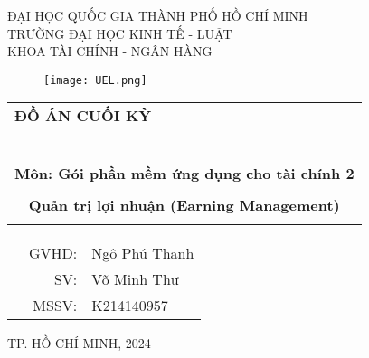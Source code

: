 \documentclass[a4paper]{article}
\begin{document}
\begin{titlepage}
\begin{center}
ĐẠI HỌC QUỐC GIA THÀNH PHỐ HỒ CHÍ MINH \\
TRƯỜNG ĐẠI HỌC KINH TẾ - LUẬT \\
KHOA TÀI CHÍNH - NGÂN HÀNG 
\end{center}

\vspace{1cm}

\begin{figure}[h!]
\begin{center}
\texttt{[image: UEL.png]}
\end{center}
\end{figure}

\vspace{1cm}


\begin{center}
\begin{tabular}{c}
	\multicolumn{1}{l}{\textbf{{\Large ĐỒ ÁN CUỐI KỲ}}}\\
	~~\\
	\hline
	\\
	\multicolumn{1}{l}{\textbf{{\Large Môn: Gói phần mềm ứng dụng cho tài chính 2}}}\\
	\\
	
	\textbf{{\Large Quản trị lợi nhuận (Earning Management)}}\\
	\\
	\hline
\end{tabular}
\end{center}

\vspace{3cm}

\begin{table}[h]
\begin{tabular}{rrl}
\hspace{5 cm} & GVHD: & Ngô Phú Thanh\\
& SV: & Võ Minh Thư\\
& MSSV: & K214140957\\
\end{tabular}
\end{table}

\begin{center}
{\footnotesize TP. HỒ CHÍ MINH, 2024}
\end{center}
\end{titlepage}


\thispagestyle{empty}
\tableofcontents
{}
\clearpage
{}
\listoffigures
{}
\listoftables
\clearpage
\newpage
{}
\setcounter{page}{1}
\renewcommand{\arraystretch}{1.5}
\end{document}
